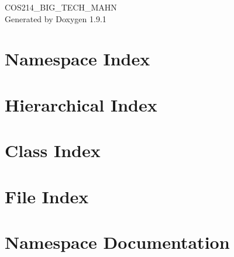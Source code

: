\let\mypdfximage\pdfximage\def\pdfximage{\immediate\mypdfximage}\documentclass[twoside]{book}
\newcommand{\+}{\discretionary{\mbox{\scriptsize$\hookleftarrow$}}{}{}}
\newcommand{\clearemptydoublepage}{%
  \newpage{\pagestyle{empty}\cleardoublepage}%
}
\begin{document}
\raggedbottom

\hypersetup{pageanchor=false,
             bookmarksnumbered=true,
             pdfencoding=unicode
            }
\begin{titlepage}
\vspace*{7cm}
\begin{center}%
{\Large COS214\+\_\+\+BIG\+\_\+\+TECH\+\_\+\+MAHN }\\
\vspace*{1cm}
{\large Generated by Doxygen 1.9.1}\\
\end{center}
\end{titlepage}
\clearemptydoublepage
{}
\tableofcontents
\clearemptydoublepage
{}
\hypersetup{pageanchor=true}

\chapter{Namespace Index}

\chapter{Hierarchical Index}

\chapter{Class Index}

\chapter{File Index}

\chapter{Namespace Documentation}










\end{document}
